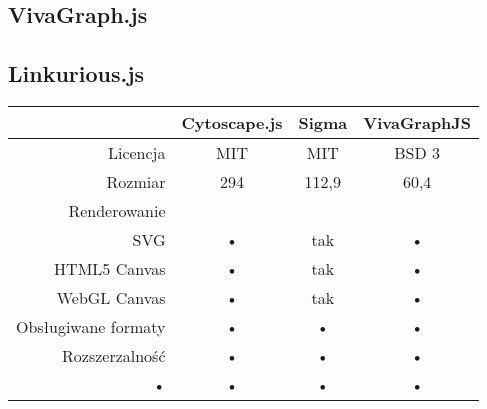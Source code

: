 \subsection{VivaGraph.js}
\subsection{Linkurious.js}

\begin{table}[H]
\begin{tabularx}{\textwidth}{|r|c|c|c}
\hline 
 & Cytoscape.js & Sigma & VivaGraphJS \\ 
\hline 
Licencja & MIT & MIT & BSD 3 \\ 
\hline 
Rozmiar & 294 & 112,9 & 60,4 \\ 
\hline 
Renderowanie & & & \\
SVG & • & tak & • \\
HTML5 Canvas & • & tak & • \\
WebGL Canvas & • & tak & • \\ 
\hline 
Obsługiwane formaty & • & • & • \\ 
\hline
Rozszerzalność & • & • & • \\ 
\hline 
• & • & • & • \\ 
\hline 
\end{tabularx} 
\end{table}



